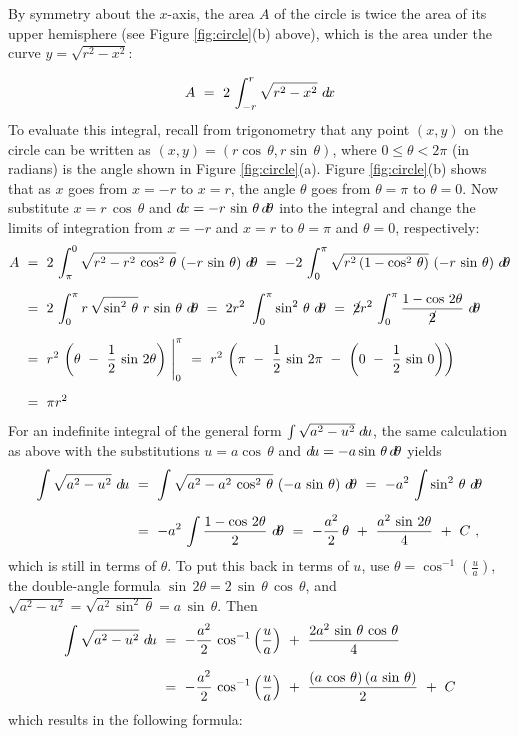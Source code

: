 By symmetry about the $x$-axis, the area $A$ of the circle is twice the area
of its upper hemisphere (see Figure \ref{fig:circle}(b) above), which is
the area under the curve $y =\sqrt{r^2 - x^2}$:

\[
A ~=~ 2 \, \int_{-r}^{r} \sqrt{r^2 - x^2}~d\!x
\]
To evaluate this integral, recall from trigonometry that any point $(x,y)$ on
the circle can be written as $(x,y)=(r\cos\,\theta,r\sin\,\theta)$, where
$0 \le \theta < 2\pi$ (in radians) is the angle shown in Figure
\ref{fig:circle}(a). Figure \ref{fig:circle}(b) shows that as $x$ goes from
$x=-r$ to $x=r$, the angle $\theta$ goes from $\theta = \pi$ to $\theta = 0$.
Now substitute $x=r\,\cos\,\theta$ and $d\!x=-r\,\sin\,\theta\,d\!\theta$ into the
integral and change the limits of integration from $x=-r$ and $x=r$ to $\theta
=\pi$ and $\theta=0$, respectively:
\begin{align*}
A ~&=~ 2 \,\int_{\pi}^{0} \sqrt{r^2 - r^2\,\cos^2 \,\theta}~(-r\,\sin\,\theta)~d\!\theta
  ~=~  -2 \,\int_{0}^{\pi} \sqrt{r^2\,(1 - \cos^2 \,\theta)}~(-r\,\sin\,\theta)~d\!\theta\\[6pt]
&=~ 2 \,\int_{0}^{\pi} r\,\sqrt{\sin^2\,\theta}~r\,\sin\,\theta~d\!\theta
  ~=~ 2r^2 \,\,\int_{0}^{\pi} \sin^2\,\theta~d\!\theta
  ~=~ \cancel{2}r^2 \,\int_{0}^{\pi} \frac{1 - \cos\,2\theta}{\cancel{2}}~d\!\theta\\[6pt]
&=~ r^2 \,\left(\theta ~-~ \frac{1}{2}\,\sin\,2\theta\right)~\Biggr|_0^{\pi}
  ~=~ r^2 \,\left(\pi ~-~ \frac{1}{2}\,\sin\,2\pi ~-~ \left(0
      ~-~ \frac{1}{2}\,\sin\,0\right)\right)\\[6pt]
&=~ \pi r^2 \quad\relax
\end{align*}
\newpage
For an indefinite integral of the general form $\int \sqrt{a^2 - u^2}\;d\!u$, the
same calculation as above with the substitutions $u=a \cos\,\theta$ and
$d\!u=-a \sin\,\theta\,d\!\theta$ yields
\begin{align*}
\int \sqrt{a^2 - u^2}~d\!u ~&=~ \int \sqrt{a^2 - a^2\,\cos^2 \,\theta}~(-a\,\sin\,\theta)~d\!\theta
 ~=~ -a^2 \,\int \sin^2\,\theta~d\!\theta\\[6pt]
&=~ -a^2 \,\int \frac{1 - \cos\,2\theta}{2}~d\!\theta
 ~=~ -\frac{a^2}{2}\,\theta ~+~ \frac{a^2\,\sin\,2\theta}{4} ~+~ C ~,
\end{align*}
which is still in terms of $\theta$. To put this back in terms of $u$, use
$\theta = \cos^{-1} (\frac{u}{a})$, the double-angle formula
$\sin\,2\theta = 2\,\sin\,\theta\,\cos\,\theta$, and
$\sqrt{a^2 - u^2} = \sqrt{a^2\,\sin^2\,\theta} = a\,\sin\,\theta$. Then
\begin{align*}
\int \sqrt{a^2 - u^2}~d\!u ~&=~ -\frac{a^2}{2}\,\cos^{-1} \left(\frac{u}{a}\right) ~+~
   \frac{2a^2\,\sin\,\theta\,\cos\,\theta}{4}\\[6pt]
&=~ -\frac{a^2}{2}\,\cos^{-1} \left(\frac{u}{a}\right) ~+~
   \frac{(a\,\cos\,\theta)\,(a\,\sin\,\theta)}{2} ~+~ C 
\end{align*}
which results in the following formula:

